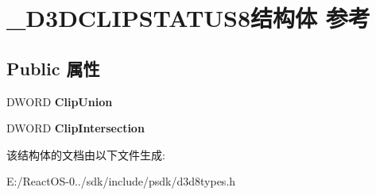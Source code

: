 \hypertarget{struct___d3_d_c_l_i_p_s_t_a_t_u_s8}{}\section{\+\_\+\+D3\+D\+C\+L\+I\+P\+S\+T\+A\+T\+U\+S8结构体 参考}
\label{struct___d3_d_c_l_i_p_s_t_a_t_u_s8}
\subsection*{Public 属性}
\begin{DoxyCompactItemize}
\item 
\mbox{\label{struct___d3_d_c_l_i_p_s_t_a_t_u_s8_a9ee74471e0a48e4282e22654c72d2ee0}} 
D\+W\+O\+RD {\bfseries Clip\+Union}
\item 
\mbox{\label{struct___d3_d_c_l_i_p_s_t_a_t_u_s8_ad917a7a0b97249cb092e7187f2deb9a7}} 
D\+W\+O\+RD {\bfseries Clip\+Intersection}
\end{DoxyCompactItemize}


该结构体的文档由以下文件生成\+:\begin{DoxyCompactItemize}
\item 
E\+:/\+React\+O\+S-\/0../sdk/include/psdk/d3d8types.\+h\end{DoxyCompactItemize}
